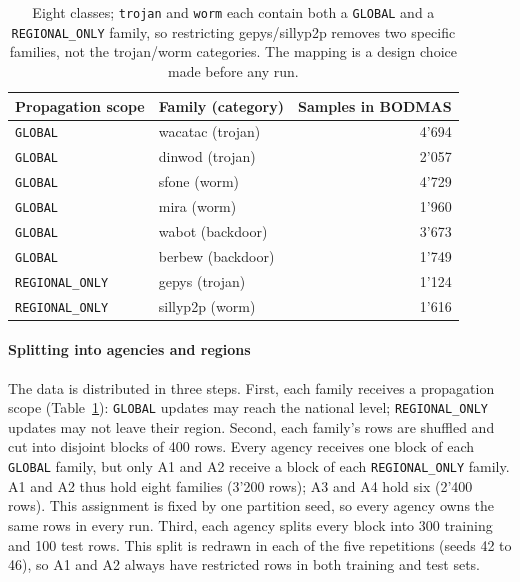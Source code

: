 \begin{table}[t]
\centering
\scriptsize
\caption{Eight classes; \texttt{trojan} and \texttt{worm} each contain both a
\texttt{GLOBAL} and a \texttt{REGIONAL\_ONLY} family, so restricting
gepys/sillyp2p removes two specific families, not the trojan/worm
categories. The mapping is a design choice made before any run.}
\label{tab:families}
\begin{tabular}{llr}
\toprule
Propagation scope & Family (category) & Samples in BODMAS \\
\midrule
\texttt{GLOBAL} & wacatac (trojan)   & 4'694 \\
\texttt{GLOBAL} & dinwod (trojan)    & 2'057 \\
\texttt{GLOBAL} & sfone (worm)       & 4'729 \\
\texttt{GLOBAL} & mira (worm)        & 1'960 \\
\texttt{GLOBAL} & wabot (backdoor)   & 3'673 \\
\texttt{GLOBAL} & berbew (backdoor)  & 1'749 \\
\texttt{REGIONAL\_ONLY} & gepys (trojan)    & 1'124 \\
\texttt{REGIONAL\_ONLY} & sillyp2p (worm)   & 1'616 \\
\bottomrule
\end{tabular}
\end{table}

\paragraph{Splitting into agencies and regions}
The data is distributed in three steps. 
First, each family receives a propagation scope (Table~\ref{tab:families}): \texttt{GLOBAL} updates may reach the national level; \texttt{REGIONAL\_ONLY} updates may not leave their region. 
Second, each family's rows are shuffled and cut into disjoint blocks of 400 rows. Every agency receives one block of each \texttt{GLOBAL} family, but only A1 and A2 receive a block of each \texttt{REGIONAL\_ONLY} family. A1 and A2 thus hold eight families (3'200 rows); A3 and A4 hold six (2'400 rows). This assignment is fixed by one partition seed, so every agency owns the same rows in every run. 
Third, each agency splits every block into 300 training and 100 test rows. This split is redrawn in each of the five repetitions (seeds 42 to 46), so A1 and A2 always have restricted rows in both training and test sets.


